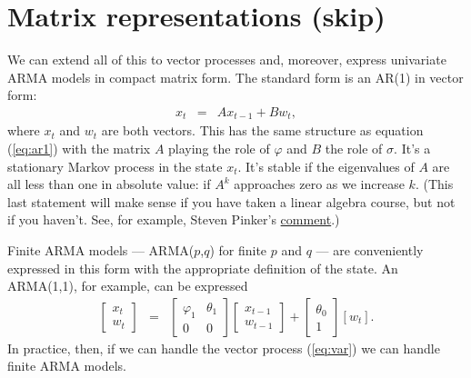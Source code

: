 \documentclass[11pt]{article}
\begin{document}
\section{Matrix representations (skip)}
\label{sec:matrix}


We can extend all of this to vector processes and, moreover,
express univariate ARMA models in compact matrix form.
The standard form is an AR(1) in vector form:
\begin{eqnarray}
    x_{t} &=& A x_{t-1} + B w_{t} ,
    \label{eq:var}
\end{eqnarray}
where $x_t$ and $w_t$ are both vectors.
This has the same structure as equation (\ref{eq:ar1}) with the matrix $A$
playing the role of $\varphi$ and $B$ the role of $\sigma$.
It's a stationary Markov process in the state $x_t$.
It's stable if the eigenvalues of $A$ are all less than one in absolute value:
if $A^k$ approaches zero as we increase $k$.
(This last statement will make sense if you have taken a linear algebra course,
but not if you haven't.
See, for example, Steven Pinker's
\href{http://www.nytimes.com/2009/11/15/books/review/Pinker-t.html?pagewanted=all&_r=0}{comment}.)

Finite ARMA models ---
ARMA($p$,$q$) for finite $p$ and $q$ ---
are conveniently expressed in this form with the appropriate definition
of the state.
An ARMA(1,1), for example, can be expressed
\begin{eqnarray*}
    \left[
    \begin{array}{c}
    x_t \\ w_t
    \end{array}
    \right]
    &=&
    \left[
    \begin{array}{cc}
    \varphi_1 & \theta_1 \\ 0 & 0
    \end{array}
    \right]
    \left[
    \begin{array}{c}
    x_{t-1} \\ w_{t-1}
    \end{array}
    \right]
    +
    \left[
    \begin{array}{c}
    \theta_0 \\ 1
    \end{array}
    \right]
    [w_t ] .
\end{eqnarray*}
In practice, then,
if we can handle the vector process (\ref{eq:var})
we can handle finite ARMA models.

\end{document}
